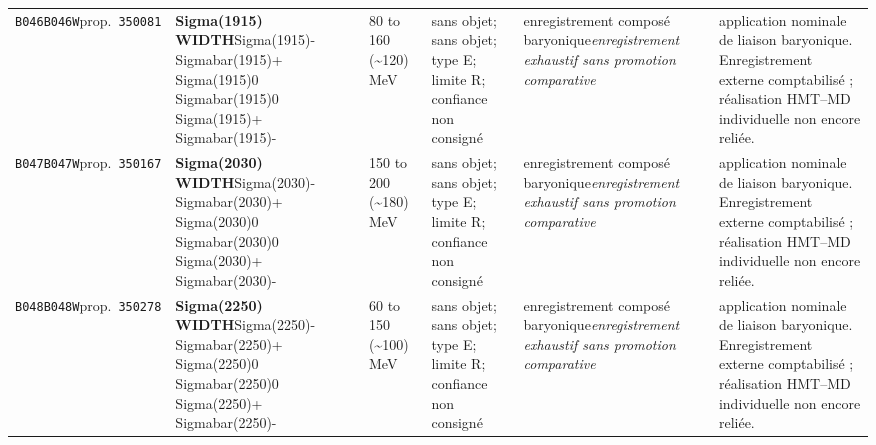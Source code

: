 \begin{landscape}
\begin{longtable}{L{1.85cm}L{4.45cm}L{2.35cm}L{4.05cm}L{3.35cm}L{7.15cm}}
\texttt{B046}\newline \texttt{B046W}\newline prop.\ \texttt{350081} & \textbf{Sigma(1915) WIDTH}\newline Sigma(1915)- \textbar{}\allowbreak{} Sigmabar(1915)+ \textbar{}\allowbreak{} Sigma(1915)0 \textbar{}\allowbreak{} Sigmabar(1915)0 \textbar{}\allowbreak{} Sigma(1915)+ \textbar{}\allowbreak{} Sigmabar(1915)- & 80 to 160 (\textasciitilde{}120)\,MeV & sans objet; sans objet; type E; limite R; confiance non consigné & enregistrement composé baryonique\newline \emph{enregistrement exhaustif sans promotion comparative} & application nominale de liaison baryonique. Enregistrement externe comptabilisé ; réalisation HMT--MD individuelle non encore reliée. \\
\texttt{B047}\newline \texttt{B047W}\newline prop.\ \texttt{350167} & \textbf{Sigma(2030) WIDTH}\newline Sigma(2030)- \textbar{}\allowbreak{} Sigmabar(2030)+ \textbar{}\allowbreak{} Sigma(2030)0 \textbar{}\allowbreak{} Sigmabar(2030)0 \textbar{}\allowbreak{} Sigma(2030)+ \textbar{}\allowbreak{} Sigmabar(2030)- & 150 to 200 (\textasciitilde{}180)\,MeV & sans objet; sans objet; type E; limite R; confiance non consigné & enregistrement composé baryonique\newline \emph{enregistrement exhaustif sans promotion comparative} & application nominale de liaison baryonique. Enregistrement externe comptabilisé ; réalisation HMT--MD individuelle non encore reliée. \\
\texttt{B048}\newline \texttt{B048W}\newline prop.\ \texttt{350278} & \textbf{Sigma(2250) WIDTH}\newline Sigma(2250)- \textbar{}\allowbreak{} Sigmabar(2250)+ \textbar{}\allowbreak{} Sigma(2250)0 \textbar{}\allowbreak{} Sigmabar(2250)0 \textbar{}\allowbreak{} Sigma(2250)+ \textbar{}\allowbreak{} Sigmabar(2250)- & 60 to 150 (\textasciitilde{}100)\,MeV & sans objet; sans objet; type E; limite R; confiance non consigné & enregistrement composé baryonique\newline \emph{enregistrement exhaustif sans promotion comparative} & application nominale de liaison baryonique. Enregistrement externe comptabilisé ; réalisation HMT--MD individuelle non encore reliée. \\

\end{longtable}
\end{landscape}

